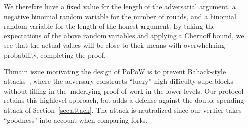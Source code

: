 We therefore have a fixed value for the length of the adversarial argument, a
negative binomial random variable for the number of rounds, and a binomial
random variable for the length of the honest argument. By taking the
expectations of the above random variables and applying a Chernoff bound, we see
that the actual values will be close to their means with overwhelming
probability, completing the proof.

Thmain issue motivating the design of PoPoW is to prevent Bahack-style
attacks~\cite{bahack}, where the adversary constructs ``lucky'' high-difficulty
superblocks without filling in the underlying proof-of-work in the lower
levels.
%
%
%
Our protocol retains this highlevel approach, but adds a defense against the double-spending attack of Section~\ref{sec:attack}. The attack is neutralized since our
verifier takes ``goodness'' into account when comparing forks.
